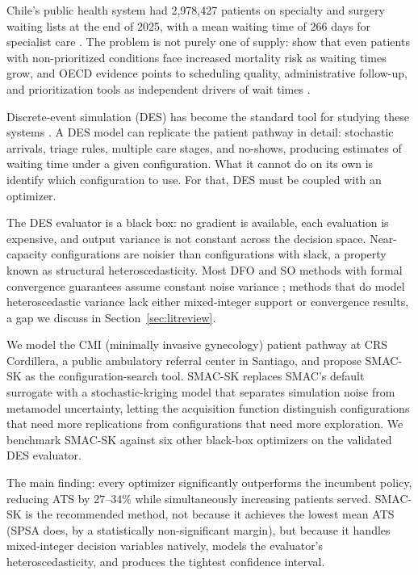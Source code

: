 \documentclass[11pt]{elsarticle}
\begin{document}
Chile's public health system had 2{,}978{,}427 patients on specialty and surgery waiting lists at the end of 2025, with a mean waiting time of 266 days for specialist care \citep{MINSAL2025}. The problem is not purely one of supply: \citet{Martinez2019} show that even patients with non-prioritized conditions face increased mortality risk as waiting times grow, and OECD evidence points to scheduling quality, administrative follow-up, and prioritization tools as independent drivers of wait times \citep{OECD2020,OECD2025}.

Discrete-event simulation (DES) has become the standard tool for studying these systems \citep{Law2015,MonksHarper2025}. A DES model can replicate the patient pathway in detail: stochastic arrivals, triage rules, multiple care stages, and no-shows, producing estimates of waiting time under a given configuration. What it cannot do on its own is identify which configuration to use. For that, DES must be coupled with an optimizer.

The DES evaluator is a black box: no gradient is available, each evaluation is expensive, and output variance is not constant across the decision space. Near-capacity configurations are noisier than configurations with slack, a property known as structural heteroscedasticity. Most DFO and SO methods with formal convergence guarantees assume constant noise variance \citep{Conn2009,Amaran2016,Shashaani2018}; methods that do model heteroscedastic variance lack either mixed-integer support or convergence results, a gap we discuss in Section~\ref{sec:litreview}.

We model the CMI (minimally invasive gynecology) patient pathway at CRS Cordillera, a public ambulatory referral center in Santiago, and propose SMAC-SK as the configuration-search tool. SMAC-SK replaces SMAC's default surrogate \citep{Hutter2011,Lindauer2022} with a stochastic-kriging model \citep{Ankenman2010} that separates simulation noise from metamodel uncertainty, letting the acquisition function distinguish configurations that need more replications from configurations that need more exploration. We benchmark SMAC-SK against six other black-box optimizers on the validated DES evaluator.

The main finding: every optimizer significantly outperforms the incumbent policy, reducing ATS by 27--34\% while simultaneously increasing patients served. SMAC-SK is the recommended method, not because it achieves the lowest mean ATS (SPSA does, by a statistically non-significant margin), but because it handles mixed-integer decision variables natively, models the evaluator's heteroscedasticity, and produces the tightest confidence interval.
\end{document}
